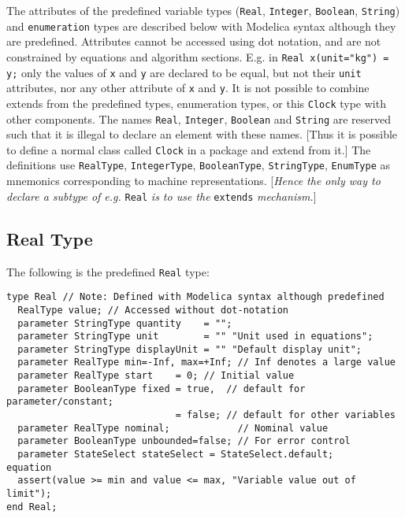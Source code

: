 The attributes of the predefined variable types (\lstinline!Real!, \lstinline!Integer!, \lstinline!Boolean!,
\lstinline!String!) and \lstinline!enumeration! types are described below with Modelica syntax
although they are predefined. Attributes cannot be accessed using dot
notation, and are not constrained by equations and algorithm sections.
E.g. in \lstinline!Real x(unit="kg") = y;! only the values of \lstinline!x! and \lstinline!y! are declared
to be equal, but not their \lstinline!unit! attributes, nor any other attribute of \lstinline!x!
and \lstinline!y!. It is not possible to combine extends from the predefined types,
enumeration types, or this \lstinline!Clock! type with other components. The names
\lstinline!Real!, \lstinline!Integer!, \lstinline!Boolean! and \lstinline!String! are reserved such that it is illegal
to declare an element with these names. {[}Thus it is possible to define
a normal class called \lstinline!Clock! in a package and extend from it.{]} The
definitions use \lstinline!RealType!, \lstinline!IntegerType!,
\lstinline!BooleanType!, \lstinline!StringType!, \lstinline!EnumType!
as mnemonics corresponding to machine representations. {[}\emph{Hence
the only way to declare a subtype of e.g.} \lstinline!Real! \emph{is to use the}
\lstinline!extends! \emph{mechanism.}{]}

\subsection{Real Type}

The following is the predefined \lstinline!Real! type:

\begin{lstlisting}[language=modelica]
type Real // Note: Defined with Modelica syntax although predefined
  RealType value; // Accessed without dot-notation
  parameter StringType quantity    = "";
  parameter StringType unit        = "" "Unit used in equations";
  parameter StringType displayUnit = "" "Default display unit";
  parameter RealType min=-Inf, max=+Inf; // Inf denotes a large value
  parameter RealType start    = 0; // Initial value
  parameter BooleanType fixed = true,  // default for parameter/constant;
                              = false; // default for other variables
  parameter RealType nominal;            // Nominal value
  parameter BooleanType unbounded=false; // For error control
  parameter StateSelect stateSelect = StateSelect.default;
equation
  assert(value >= min and value <= max, "Variable value out of limit");
end Real;
\end{lstlisting}

